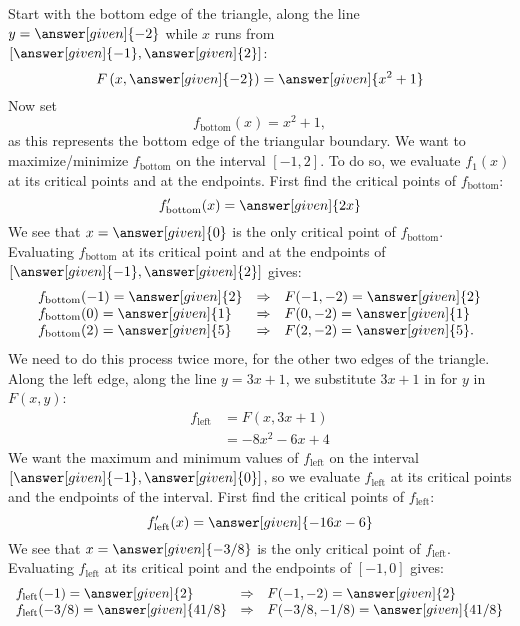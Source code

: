 \documentclass{ximera}
\begin{document}
\begin{example}
\begin{explanation}
    Start with the bottom edge of the triangle, along the line
    $y=\answer[given]{-2}$ while $x$ runs from
    $\left[\answer[given]{-1},\answer[given]{2}\right]$:
    \[
    F\left(x,\answer[given]{-2}\right) = \answer[given]{x^2+1}
    \]
    Now set
    \[
    f_{\mathrm{bottom}}(x) = x^2+1,
    \]
    as this represents the bottom edge of the triangular boundary. We
    want to maximize/minimize $f_{\mathrm{bottom}}$ on the interval
    $[-1,2]$. To do so, we evaluate $f_1(x)$ at its critical points
    and at the endpoints.  First find the critical points of
    $f_{\mathrm{bottom}}$:
    \[
    f_{\mathrm{bottom}}'(x)= \answer[given]{2x}
    \]
    We see that $x= \answer[given]{0}$ is the only critical point of
    $f_{\mathrm{bottom}}$. Evaluating $f_{\mathrm{bottom}}$ at its
    critical point and at the endpoints of
    $\left[\answer[given]{-1},\answer[given]{2}\right]$ gives:
    \[
    \begin{array}{lcl}
      f_{\mathrm{bottom}}(-1) = \answer[given]{2} &\Rightarrow & F(-1,-2) = \answer[given]{2}\\
      f_{\mathrm{bottom}}(0)  = \answer[given]{1} &\Rightarrow & F(0,-2)  = \answer[given]{1}\\
      f_{\mathrm{bottom}}(2)  = \answer[given]{5} &\Rightarrow & F(2,-2)  = \answer[given]{5}.
    \end{array}
    \]
    We need to do this process twice more, for the other two edges of
    the triangle.  Along the left edge, along the line $y=3x+1$, we
    substitute $3x+1$ in for $y$ in $F(x,y)$:
    \begin{align*}
    f_{\mathrm{left}} &= F(x,3x+1)\\
    &= -8x^2-6x+4
    \end{align*}
    We want the maximum and minimum values of $f_{\mathrm{left}}$ on
    the interval $\left[\answer[given]{-1},\answer[given]{0}\right]$, so we
    evaluate $f_{\mathrm{left}}$ at its critical points and the
    endpoints of the interval. First find the critical points of
    $f_{\mathrm{left}}$:
    \[
    f'_{\mathrm{left}}(x) = \answer[given]{-16x-6}
    \]
    We see that $x = \answer[given]{-3/8}$ is the only critical point
    of $f_{\mathrm{left}}$.  Evaluating $f_{\mathrm{left}}$ at its
    critical point and the endpoints of $[-1,0]$ gives:
    \[
    \begin{array}{lcl}
      f_{\mathrm{left}}(-1) = \answer[given]{2} &\Rightarrow& F(-1,-2) = \answer[given]{2}\\
      f_{\mathrm{left}}(-3/8) = \answer[given]{41/8}  &\Rightarrow & F(-3/8,-1/8) = \answer[given]{41/8} \\

\end{array}\]
\end{explanation}
\end{example}
\end{document}
